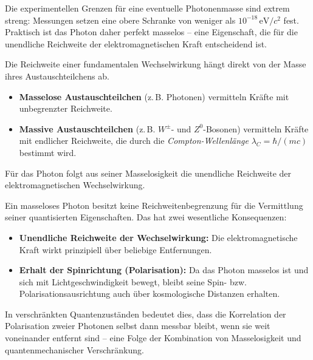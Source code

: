 Die experimentellen Grenzen für eine eventuelle Photonenmasse sind extrem streng:  
Messungen setzen eine obere Schranke von weniger als \(10^{-18}\,\mathrm{eV}/c^2\) fest.  
Praktisch ist das Photon daher perfekt masselos – eine Eigenschaft, die für die unendliche Reichweite der elektromagnetischen Kraft entscheidend ist.
\vspace{1em}
\begin{tcolorbox}[hinweisbox, title=Masselosigkeit und Reichweite]
	\label{box:reichweite_masselos}
	\small
	Die Reichweite einer fundamentalen Wechselwirkung hängt direkt von der Masse ihres Austauschteilchens ab.  
	\begin{itemize}
		\item \textbf{Masselose Austauschteilchen} (z.\,B. Photonen) vermitteln Kräfte mit unbegrenzter Reichweite.  
		\item \textbf{Massive Austauschteilchen} (z.\,B. \(W^\pm\)- und \(Z^0\)-Bosonen) vermitteln Kräfte mit endlicher Reichweite, die durch die \emph{Compton-Wellenlänge} \(\lambda_C = \hbar/(mc)\) bestimmt wird.
	\end{itemize}
	Für das Photon folgt aus seiner Masselosigkeit die unendliche Reichweite der elektromagnetischen Wechselwirkung.
\end{tcolorbox}
\vspace{1em}
\begin{tcolorbox}[physikbox, title=Masseloses Photon und Spinwirkung über große Distanzen]
	\label{box:photon_spin_reichweite}
	\small
	Ein masseloses Photon besitzt keine Reichweitenbegrenzung für die Vermittlung seiner quantisierten Eigenschaften.  
	Das hat zwei wesentliche Konsequenzen:
	\begin{itemize}
		\item \textbf{Unendliche Reichweite der Wechselwirkung:} Die elektromagnetische Kraft wirkt prinzipiell über beliebige Entfernungen.
		\item \textbf{Erhalt der Spinrichtung (Polarisation):} Da das Photon masselos ist und sich mit Lichtgeschwindigkeit bewegt, bleibt seine Spin- bzw. Polarisationsausrichtung auch über kosmologische Distanzen erhalten. 
	\end{itemize}
	In verschränkten Quantenzuständen bedeutet dies, dass die Korrelation der Polarisation zweier Photonen selbst dann messbar bleibt, wenn sie weit voneinander entfernt sind – eine Folge der Kombination von Masselosigkeit und quantenmechanischer Verschränkung.
\end{tcolorbox}


